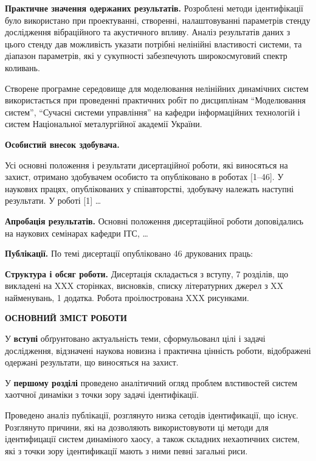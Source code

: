 \documentclass[a4paper,12pt]{atuaref}
\newcommand{\xsect}[1]{\medskip\begin{center}\textbf{#1}\end{center}\medskip\penalty10000}
\begin{document}
\smallskip
\textbf{Практичне значення одержаних результатів.}
Розроблені методи ідентифікації було використано
при проектуванні, створенні, налаштовуванні параметрів
стенду дослідження вібраційного та акустичного впливу.
Аналіз результатів даних з цього стенду
дав можливість указати потрібні нелінійні властивості системи,
та діапазон параметрів, які у сукупності
забезпечують широкосмуговий спектр коливань.

Створене програмне середовище для моделювання нелінійних динамічних систем
використається при проведенні практичних робіт по дисциплінам
``Моделювання систем'',
``Сучасні системи управління'' на кафедри інформаційних технологій
і систем Національної металургійної академії України.


\smallskip
\textbf{Особистий внесок здобувача.}

Усі основні положення і результати
дисертаційної роботи, які виносяться на захист, отримано здобувачем особисто та
опубліковано в роботах [1--46]. У наукових працях, опублікованих у співавторстві,
здобувачу належать наступні результати. У роботі [1] \ldots



\smallskip
\textbf{Апробація результатів.}
Основні положення дисертаційної роботи доповідались на наукових
семінарах кафедри ІТС, \ldots

\smallskip
\textbf{Публікації.}
По темі дисертації опубліковано
46 друкованих праць:

\smallskip
\textbf{Структура і обсяг роботи.}
Дисертація складається з вступу, 7 розділів, що викладені на
XXX сторінках, висновків, списку літературних джерел з
XX найменувань,
1 додатка.
Робота проілюстрована XXX рисунками.


\xsect{ОСНОВНИЙ ЗМІСТ РОБОТИ}

У \textbf{вступі} обґрунтовано актуальність теми,
сформульованл цілі і задачі дослідження,
відзначені наукова новизна і практична цінність роботи, відображені
одержані результати, що виносяться на захист.

У \textbf{першому розділі}
проведено аналітичний огляд проблем
влстивостей систем хаотчної динаміки
з точки зору задачі ідентифікації.

Проведено аналіз публікації,
розглянуто низка сетодів ідентификації,
що існує.
Розглянуто причини,
які на дозволяють використовувоти ці методи для
ідентифицації систем динаміного хаосу,
а також складних нехаотичних систем,
які з точки зору ідентификації
мають з ними певні загальні риси.
\end{document}
